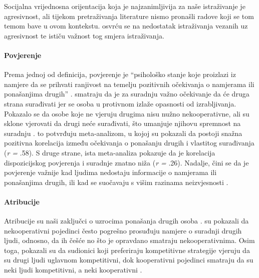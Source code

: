 \documentclass[a4paper, 12pt]{report}
\newcommand{\mti}[1]{\textit{#1}}
\begin{document}
Socijalna vrijednosna orijentacija koja je najzanimljivija za naše istraživanje
je agresivnost, ali tijekom pretraživanja literature nismo pronašli radove koji
se tom temom bave u ovom kontekstu. 
 osvrću se na nedostatak istraživanja vezanih uz
agresivnost te ističu važnost tog smjera istraživanja.

\paragraph{Povjerenje} Prema jednoj od definicija, povjerenje je
\enquote{psihološko stanje koje proizlazi iz namjere da se prihvati ranjivost
    na temelju pozitivnih očekivanja o namjerama ili ponašanjima drugih}
\citep*[str. 395]{rousseau1998not}.
\citet{20yexg} smatraju da je za suradnju važno očekivanje da će druga
strana surađivati jer se osoba u protivnom izlaže opasnosti od izrabljivanja.
Pokazalo se da osobe koje ne vjeruju drugima nisu nužno nekooperativne, ali
su sklone vjerovati da drugi neće surađivati, što umanjuje njihovu spremnost na
suradnju \citep{vancoop}. \citet{balliet2013trust}
to potvrđuju meta-analizom, u kojoj su pokazali da postoji snažna pozitivna korelacija između očekivanja o
ponašanju drugih i vlastitog surađivanja (\mti{r =} .58). S druge strane, ista
meta-analiza pokazuje da je korelacija
dispozicijskog povjerenja i suradnje znatno  niža (\mti{r =} .26). Nadalje, čini se da je povjerenje važnije kad ljudima
nedostaju informacije o namjerama ili ponašanjima drugih, ili kad se suočavaju s
višim razinama neizvjesnosti \citep{vancoop}.  

\paragraph{Atribucije} Atribucije su naši zaključci o uzrocima ponašanja drugih
osoba \citep{aronson}. \citet{kelley1970inference} su pokazali da
nekooperativni pojedinci često pogrešno prosuđuju namjere o suradnji
drugih ljudi, odnosno, da ih češće no što je opravdano smatraju nekooperativnima. Osim
toga, pokazali su da sudionici koji preferiraju kompetitivne strategije vjeruju
da su drugi ljudi uglavnom kompetitivni, dok kooperativni pojedinci smatraju
da su neki ljudi kompetitivni, a neki kooperativni \citep{kelley1970social}.
\end{document}
